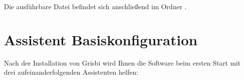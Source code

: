 \setlength{\parindent}{20pt}
\par
\par
{}

Die ausführbare Datei befindet sich anschließend im Ordner .


\section{Assistent Basiskonfiguration\label{start-first}}

Nach der Installation von Grisbi wird Ihnen die Software beim ersten Start mit drei aufeinanderfolgenden Assistenten helfen:

